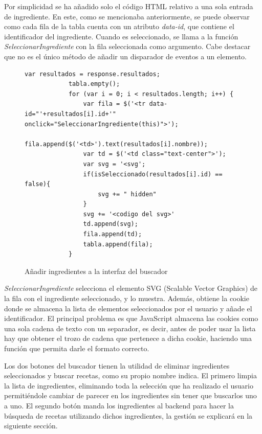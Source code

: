 \newpage
Por simplicidad se ha añadido solo el código \gls{HTML} relativo a una sola entrada de ingrediente. En este, como se mencionaba anteriormente, se puede observar como cada fila de la tabla cuenta con un atributo \textit{data-id}, que contiene el identificador del ingrediente. Cuando es seleccionado, se llama a la función \textit{SeleccionarIngrediente} con la fila seleccionada como argumento. Cabe destacar que no es el único método de añadir un disparador de eventos a un elemento. 

\begin{figure}[H]
    \begin{lstlisting}[style=consola]
         var resultados = response.resultados;
            tabla.empty();
            for (var i = 0; i < resultados.length; i++) {
                var fila = $('<tr data-id="'+resultados[i].id+'" onclick="SeleccionarIngrediente(this)">');
                fila.append($('<td>').text(resultados[i].nombre));
                var td = $('<td class="text-center">');
                var svg = '<svg';
                if(isSeleccionado(resultados[i].id) == false){
                    svg += " hidden"
                }
                svg += '<codigo del svg>'
                td.append(svg);
                fila.append(td);
                tabla.append(fila);
            }
\end{lstlisting}
\caption{Añadir ingredientes a la interfaz del buscador}
\label{sni:JSBuscar}
\end{figure}

\textit{SeleccionarIngrediente} selecciona el elemento \gls{SVG} (Scalable Vector Graphics) de la fila con el ingrediente seleccionado, y lo muestra. Además, obtiene la \gls{cookie} donde se almacena la lista de elementos seleccionados por el usuario y añade el identificador. El principal problema es que JavaScript almacena las \glspl{cookie} como una sola cadena de texto con un separador, es decir, antes de poder usar la lista hay que obtener el trozo de cadena que pertenece a dicha \gls{cookie}, haciendo una función que permita darle el formato correcto.

Los dos botones del buscador tienen la utilidad de eliminar ingredientes seleccionados y buscar recetas, como su propio nombre indica. El primero limpia la lista de ingredientes, eliminando toda la selección que ha realizado el usuario permitiéndole cambiar de parecer en los ingredientes sin tener que buscarlos uno a uno. El segundo botón manda los ingredientes al \gls{backend} para hacer la búsqueda de recetas utilizando dichos ingredientes, la gestión se explicará en la siguiente sección.

